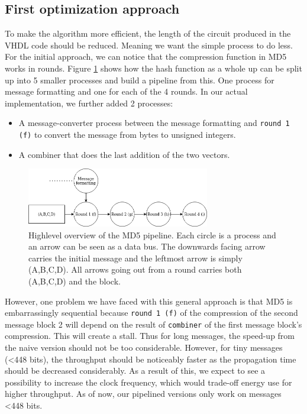 \documentclass[a4paper, openany]{book}
\begin{document}
\subsection{First optimization approach}
\label{sec:orgba25545}
To make the algorithm more efficient, the length of the circuit produced in the VHDL code should be reduced. Meaning we want the simple process to do less. For the initial approach, we can notice that the compression function in MD5 works in rounds. Figure \ref{fig:MD5opt1} shows how the hash function as a whole up can be split up into 5 smaller processes and build a pipeline from this. One process for message formatting and one for each of the 4 rounds. In our actual implementation, we further added 2 processes:
\begin{itemize}
\item A message-converter process between the message formatting and \texttt{round 1 (f)} to convert the message from bytes to unsigned integers.
\item A combiner that does the last addition of the two vectors.
\end{itemize}

\begin{figure}[H]
\centering
\includegraphics[width=8cm]{md5.png}
\caption[Pipeline MD5]{Highlevel overview of the MD5 pipeline. Each circle is a process and an arrow can be seen as a data bus. The downwards facing arrow carries the initial message and the leftmost arrow is simply (A,B,C,D). All arrows going out from a round carries both (A,B,C,D) and the block.}
\label{fig:MD5opt1}
\end{figure}

However, one problem we have faced with this general approach is that MD5 is embarrassingly sequential because \texttt{round 1 (f)} of the compression of the second message block 2 will depend on the result of \texttt{combiner} of the first message block's compression. This will create a stall. Thus for long messages, the speed-up from the naive version should not be too considerable. However, for tiny messages (<448 bits), the throughput should be noticeably faster as the propagation time should be decreased considerably. As a result of this, we expect to see a possibility to increase the clock frequency, which would trade-off energy use for higher throughput.
As of now, our pipelined versions only work on messages <448 bits.
\end{document}
